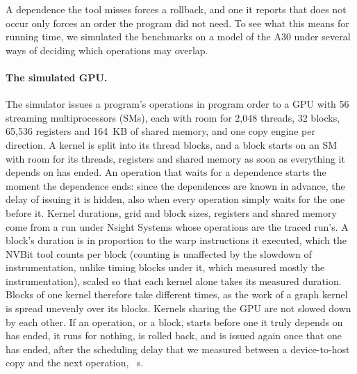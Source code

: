 \documentclass[11pt]{article}
\begin{document}
A dependence the tool misses forces a rollback, and one it reports that does not occur only forces an order the
program did not need. To see what this means for running time, we simulated the benchmarks on a model of the
A30 under several ways of deciding which operations may overlap.

\paragraph{The simulated GPU.} The simulator issues a program's operations in program order to a GPU with 56
streaming multiprocessors (SMs), each with room for 2{,}048 threads, 32 blocks, 65{,}536 registers and 164~KB of
shared memory, and one copy engine per direction. A kernel is split into its thread blocks, and a block starts on
an SM with room for its threads, registers and shared memory as soon as everything it depends on has ended. An
operation that waits for a dependence starts the moment the dependence ends: since the dependences are known in
advance, the delay of issuing it is hidden, also when every operation simply waits for the one before it. Kernel
durations, grid and block sizes, registers and shared memory come from a run under Nsight Systems whose
operations are the traced run's. A block's duration is in proportion to the warp instructions it executed, which
the NVBit tool counts per block (counting is unaffected by the slowdown of instrumentation, unlike timing blocks
under it, which measured mostly the instrumentation), scaled so that each kernel alone takes its measured
duration. Blocks of one kernel therefore take different times, as the work of a graph kernel is spread unevenly
over its blocks. Kernels sharing the GPU are not slowed down by each other. If an operation, or a block, starts
before one it truly depends on has ended, it runs for nothing, is rolled back, and is issued again once that one
has ended, after the scheduling delay that we measured between a device-to-host copy and the next operation,
\numSimDelayUs{}~\textmu s.
\end{document}

